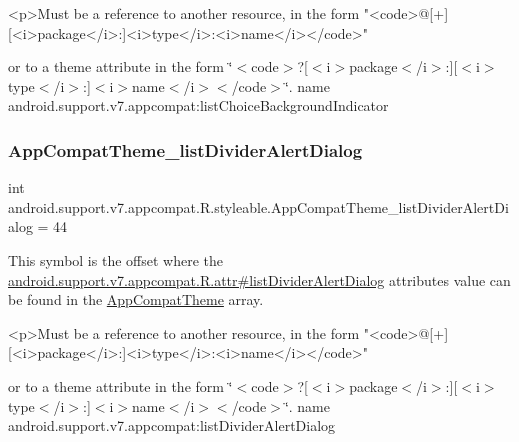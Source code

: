 \begin{DoxyVerb}      <p>Must be a reference to another resource, in the form "<code>@[+][<i>package</i>:]<i>type</i>:<i>name</i></code>"
\end{DoxyVerb}
 or to a theme attribute in the form \char`\"{}$<$code$>$?\mbox{[}$<$i$>$package$<$/i$>$\+:\mbox{]}\mbox{[}$<$i$>$type$<$/i$>$\+:\mbox{]}$<$i$>$name$<$/i$>$$<$/code$>$\char`\"{}.  name android.\+support.\+v7.\+appcompat\+:list\+Choice\+Background\+Indicator \mbox{\label{classandroid_1_1support_1_1v7_1_1appcompat_1_1R_1_1styleable_a7a821c50df10592a0cbb6633ce4d89b2}} 
\subsubsection{\texorpdfstring{App\+Compat\+Theme\+\_\+list\+Divider\+Alert\+Dialog}{AppCompatTheme\_listDividerAlertDialog}}
{\footnotesize\ttfamily int android.\+support.\+v7.\+appcompat.\+R.\+styleable.\+App\+Compat\+Theme\+\_\+list\+Divider\+Alert\+Dialog = 44\hspace{0.3cm}{\ttfamily [static]}}

This symbol is the offset where the \hyperlink{classandroid_1_1support_1_1v7_1_1appcompat_1_1R_1_1attr_a74f718ff27616bea80007993e0549993}{android.\+support.\+v7.\+appcompat.\+R.\+attr\#list\+Divider\+Alert\+Dialog} attribute\textquotesingle{}s value can be found in the \hyperlink{classandroid_1_1support_1_1v7_1_1appcompat_1_1R_1_1styleable_a5c42f89e8a410c323be34208d75c430b}{App\+Compat\+Theme} array.

\begin{DoxyVerb}      <p>Must be a reference to another resource, in the form "<code>@[+][<i>package</i>:]<i>type</i>:<i>name</i></code>"
\end{DoxyVerb}
 or to a theme attribute in the form \char`\"{}$<$code$>$?\mbox{[}$<$i$>$package$<$/i$>$\+:\mbox{]}\mbox{[}$<$i$>$type$<$/i$>$\+:\mbox{]}$<$i$>$name$<$/i$>$$<$/code$>$\char`\"{}.  name android.\+support.\+v7.\+appcompat\+:list\+Divider\+Alert\+Dialog \mbox{\label{classandroid_1_1support_1_1v7_1_1appcompat_1_1R_1_1styleable_a4a1930d25bde9775ddf86760b943b027}} 

